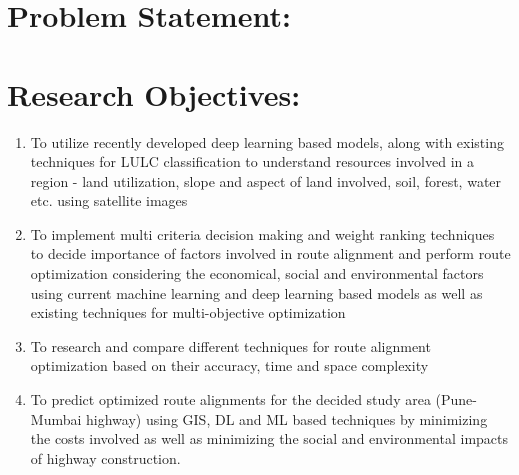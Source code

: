 \newline

\section{Problem Statement: }
\newline
\section{Research Objectives:}
\begin{enumerate}
    \item To utilize recently developed deep learning based models, along with existing techniques for LULC classification to understand resources involved in a region - land utilization, slope and aspect of land involved, soil, forest, water etc. using satellite images
   \item  To implement multi criteria decision making and weight ranking techniques to decide importance of factors involved in route alignment and perform route optimization considering the economical, social and environmental factors using current machine learning and deep learning based models as well as existing techniques for multi-objective optimization
   \item To research and compare different techniques for route alignment optimization based on their accuracy, time and space complexity
   \item  To predict optimized route alignments for the decided study area (Pune-Mumbai highway) using GIS, DL and ML based techniques by minimizing the costs involved as well as minimizing the social and environmental impacts of highway construction.

\end{enumerate}
	
